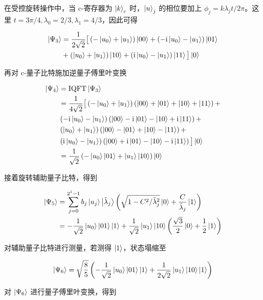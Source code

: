 \documentclass[aps,prl,twocolumn,groupedaddress]{revtex4-2}
\begin{document}
在受控旋转操作中，当 c-寄存器为 $\ket{k}_c$ 时，$\ket{u}_j$ 的相位要加上 $\phi_j=k\lambda_j t/2\pi$。这里 $t=3\pi/4,\lambda_0=2/3,\lambda_1=4/3$，因此可得

$$
\begin{aligned}
\ket{\Psi_3}
&=\frac{1 }{2\sqrt{2} } \big[\left(-\ket{u_0}+\ket{u_1} \right)\ket{00} + \left(-\mathrm{i}\ket{u_0}-\ket{u_1} \right)\ket{01} \\
&+\left(\ket{u_0}+\ket{u_1} \right)\ket{10}+\left(\mathrm{i}\ket{u_0}-\ket{u_1} \right)\ket{11} \big]\ket{0}
\end{aligned}
$$

再对 c-量子比特施加逆量子傅里叶变换

$$
\begin{aligned}
\ket{\Psi_4}
&=\mathrm{IQFT}\ket{\Psi_3} \\
&=\frac{1 }{4\sqrt{2} } \big[\left(-\ket{u_0}+\ket{u_1} \right)\left(\ket{00}+\ket{01}+\ket{10}+\ket{11} \right)+\\
&\left(-\mathrm{i}\ket{u_0}-\ket{u_1} \right)\left(\ket{00}-\mathrm{i}\ket{01}-\ket{10}+\mathrm{i}\ket{11} \right)+\\
&\left(\ket{u_0}+\ket{u_1} \right)\left(\ket{00}-\ket{01}+\ket{10}-\ket{11} \right)+\\
&\left(\mathrm{i}\ket{u_0}-\ket{u_1} \right)\left(\ket{00}+\mathrm{i}\ket{01}-\ket{10}-\mathrm{i}\ket{11} \right) \big]\ket{0} \\
&=\frac{1 }{\sqrt{2} } \left(-\ket{u_0}\ket{01}+\ket{u_1}\ket{10} \right)\ket{0}
\end{aligned}
$$

接着旋转辅助量子比特，得到

$$
\begin{aligned}
\ket{\Psi_5}
&=\sum_{j=0}^{2^1-1} b_j\ket{u_j}\Ket{\tilde{\lambda}_j}\left(\sqrt{1-C^2/\tilde{\lambda}_j^2}\ket{0} + \frac{C }{\tilde{\lambda}_j } \ket{1} \right) \\
&=-\frac{1 }{\sqrt{2} } \ket{u_0}\ket{01}\ket{1} + \frac{1 }{\sqrt{2} } \ket{u_1}\ket{10}\left(\frac{\sqrt{3} }{2 } \ket{0} + \frac{1 }{2 } \ket{1} \right) 
\end{aligned} 
$$

对辅助量子比特进行测量，若测得 $\ket{1}$，状态塌缩至

$$
\ket{\Psi_6}
=\sqrt{\frac{8 }{5 } }\left(-\frac{1 }{\sqrt{2} } \ket{u_0}\ket{01}\ket{1} + \frac{1 }{2\sqrt{2} } \ket{u_1}\ket{10}\ket{1} \right)
$$

对 $\ket{\Psi_6}$ 进行量子傅里叶变换，得到
\end{document}
